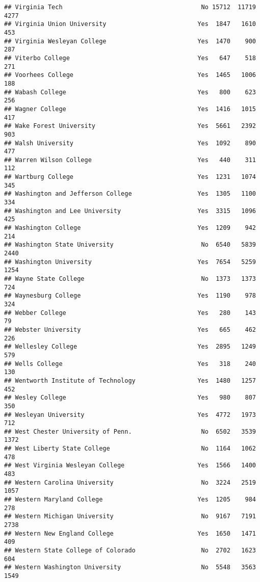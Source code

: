 \documentclass[
]{article}
\begin{document}
\begin{verbatim}
## Virginia Tech                                      No 15712  11719   4277
## Virginia Union University                         Yes  1847   1610    453
## Virginia Wesleyan College                         Yes  1470    900    287
## Viterbo College                                   Yes   647    518    271
## Voorhees College                                  Yes  1465   1006    188
## Wabash College                                    Yes   800    623    256
## Wagner College                                    Yes  1416   1015    417
## Wake Forest University                            Yes  5661   2392    903
## Walsh University                                  Yes  1092    890    477
## Warren Wilson College                             Yes   440    311    112
## Wartburg College                                  Yes  1231   1074    345
## Washington and Jefferson College                  Yes  1305   1100    334
## Washington and Lee University                     Yes  3315   1096    425
## Washington College                                Yes  1209    942    214
## Washington State University                        No  6540   5839   2440
## Washington University                             Yes  7654   5259   1254
## Wayne State College                                No  1373   1373    724
## Waynesburg College                                Yes  1190    978    324
## Webber College                                    Yes   280    143     79
## Webster University                                Yes   665    462    226
## Wellesley College                                 Yes  2895   1249    579
## Wells College                                     Yes   318    240    130
## Wentworth Institute of Technology                 Yes  1480   1257    452
## Wesley College                                    Yes   980    807    350
## Wesleyan University                               Yes  4772   1973    712
## West Chester University of Penn.                   No  6502   3539   1372
## West Liberty State College                         No  1164   1062    478
## West Virginia Wesleyan College                    Yes  1566   1400    483
## Western Carolina University                        No  3224   2519   1057
## Western Maryland College                          Yes  1205    984    278
## Western Michigan University                        No  9167   7191   2738
## Western New England College                       Yes  1650   1471    409
## Western State College of Colorado                  No  2702   1623    604
## Western Washington University                      No  5548   3563   1549

\end{verbatim}
\end{document}
